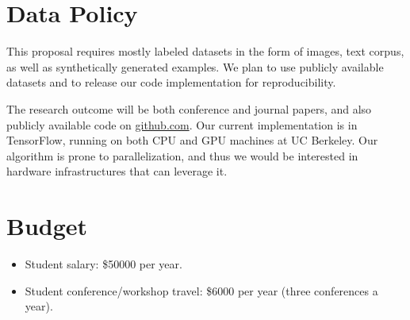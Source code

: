 \documentclass[10pt]{article}
\begin{document}
\section*{Data Policy}

This proposal requires mostly labeled datasets in the form of images, text corpus, as well as synthetically generated examples.
We plan to use publicly available datasets and to release our code implementation for reproducibility.

The research outcome will be both conference and journal papers, and also publicly available code on \url{github.com}.
Our current implementation is in TensorFlow, running on both CPU and GPU machines at UC Berkeley. Our algorithm is prone
to parallelization, and thus we would be interested in hardware infrastructures that can leverage it.

\section*{Budget}

\begin{itemize}
\item Student salary: \$50000 per year.
\item Student conference/workshop travel: \$6000 per year (three conferences a year). 
\end{itemize}

{\small 


}
\end{document}
